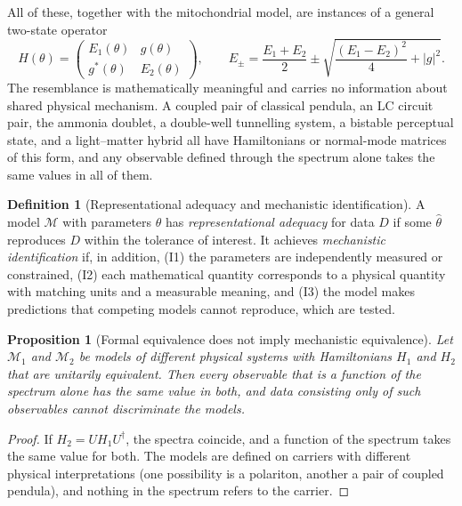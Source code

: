 \documentclass[11pt]{article}
\theoremstyle{plain}
\newtheorem{proposition}{Proposition}
\theoremstyle{definition}
\newtheorem{definition}{Definition}
\theoremstyle{remark}
\begin{document}
All of these, together with the mitochondrial model, are instances of a general two-state operator
\begin{equation}
H(\theta)=\begin{pmatrix}E_1(\theta)&g(\theta)\\ g^*(\theta)&E_2(\theta)\end{pmatrix},\qquad
E_\pm=\frac{E_1+E_2}{2}\pm\sqrt{\frac{(E_1-E_2)^2}{4}+|g|^2}.
\label{eq:general}
\end{equation}
The resemblance is mathematically meaningful and carries no information about shared physical mechanism. A coupled pair of classical pendula, an LC circuit pair, the ammonia doublet, a double-well tunnelling system, a bistable perceptual state, and a light--matter hybrid all have Hamiltonians or normal-mode matrices of this form, and any observable defined through the spectrum alone takes the same values in all of them.

\begin{definition}[Representational adequacy and mechanistic identification]
A model $\mathcal M$ with parameters $\theta$ has \emph{representational adequacy} for data $D$ if some $\hat\theta$ reproduces $D$ within the tolerance of interest. It achieves \emph{mechanistic identification} if, in addition, (I1) the parameters are independently measured or constrained, (I2) each mathematical quantity corresponds to a physical quantity with matching units and a measurable meaning, and (I3) the model makes predictions that competing models cannot reproduce, which are tested.
\end{definition}

\begin{proposition}[Formal equivalence does not imply mechanistic equivalence]
\label{prop:portable}
Let $\mathcal M_1$ and $\mathcal M_2$ be models of different physical systems with Hamiltonians $H_1$ and $H_2$ that are unitarily equivalent. Then every observable that is a function of the spectrum alone has the same value in both, and data consisting only of such observables cannot discriminate the models.
\end{proposition}

\begin{proof}
If $H_2=UH_1U^\dagger$, the spectra coincide, and a function of the spectrum takes the same value for both. The models are defined on carriers with different physical interpretations (one possibility is a polariton, another a pair of coupled pendula), and nothing in the spectrum refers to the carrier.
\end{proof}
\end{document}
